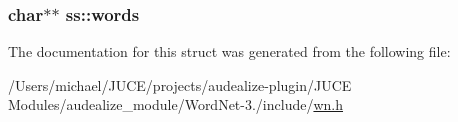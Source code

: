 \subsubsection[{\texorpdfstring{words}{words}}]{\setlength{\rightskip}{0pt plus 5cm}char$\ast$$\ast$ ss\+::words}\hypertarget{structss_acf11f446ef714859a43663592ca69011}{}\label{structss_acf11f446ef714859a43663592ca69011}


The documentation for this struct was generated from the following file\+:\begin{DoxyCompactItemize}
\item 
/\+Users/michael/\+J\+U\+C\+E/projects/audealize-\/plugin/\+J\+U\+C\+E Modules/audealize\+\_\+module/\+Word\+Net-\/3./include/\hyperlink{wn_8h}{wn.\+h}\end{DoxyCompactItemize}
